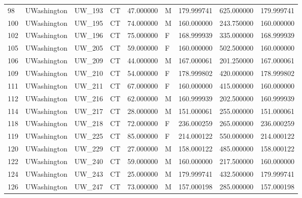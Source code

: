 \begin{tabular}{llllrlrrr}
98     &     UWashington &       UW\_193 &                 CT &  47.000000 &        M &       179.999741 &    625.000000 &  179.999741 \\
100    &     UWashington &       UW\_195 &                 CT &  74.000000 &        M &       160.000000 &    243.750000 &  160.000000 \\
102    &     UWashington &       UW\_196 &                 CT &  75.000000 &        F &       168.999939 &    335.000000 &  168.999939 \\
105    &     UWashington &       UW\_205 &                 CT &  59.000000 &        F &       160.000000 &    502.500000 &  160.000000 \\
106    &     UWashington &       UW\_209 &                 CT &  44.000000 &        M &       167.000061 &    201.250000 &  167.000061 \\
109    &     UWashington &       UW\_210 &                 CT &  54.000000 &        F &       178.999802 &    420.000000 &  178.999802 \\
111    &     UWashington &       UW\_211 &                 CT &  67.000000 &        F &       160.000000 &    415.000000 &  160.000000 \\
112    &     UWashington &       UW\_216 &                 CT &  62.000000 &        M &       160.999939 &    202.500000 &  160.999939 \\
114    &     UWashington &       UW\_217 &                 CT &  28.000000 &        M &       151.000061 &    255.000000 &  151.000061 \\
118    &     UWashington &       UW\_218 &                 CT &  72.000000 &        F &       236.000259 &    265.000000 &  236.000259 \\
119    &     UWashington &       UW\_225 &                 CT &  85.000000 &        F &       214.000122 &    550.000000 &  214.000122 \\
120    &     UWashington &       UW\_229 &                 CT &  27.000000 &        M &       158.000122 &    485.000000 &  158.000122 \\
122    &     UWashington &       UW\_240 &                 CT &  59.000000 &        M &       160.000000 &    217.500000 &  160.000000 \\
124    &     UWashington &       UW\_243 &                 CT &  25.000000 &        M &       179.999741 &    432.500000 &  179.999741 \\
126    &     UWashington &       UW\_247 &                 CT &  73.000000 &        M &       157.000198 &    285.000000 &  157.000198 \\

\end{tabular}
